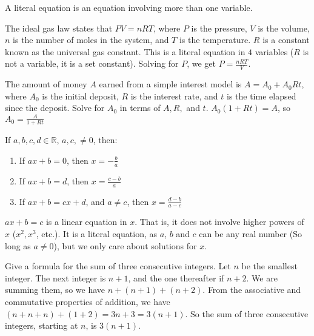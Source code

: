 \documentclass[crop=false,class=book,oneside]{standalone}                      %
\begin{document}
        \begin{definition}
        A literal equation is an equation involving more than one variable.
        \end{definition}
        \begin{example}
        The ideal gas law states that $PV=nRT$, where $P$ is the pressure, $V$ is the volume, $n$ is the number of moles in the system, and $T$ is the temperature. $R$ is a constant known as the universal gas constant. This is a literal equation in $4$ variables ($R$ is not a variable, it is a set constant). Solving for $P$, we get $P = \frac{nRT}{V}$.
        \end{example}
        \begin{example}
        The amount of money $A$ earned from a simple interest model is $A = A_0+A_0Rt$, where $A_0$ is the initial deposit, $R$ is the
        interest rate, and $t$ is the time elapsed since the deposit. Solve for $A_0$ in terms of $A,R,$ and $t$.
        $A_{0}(1+Rt)=A$, so $A_{0}=\frac{A}{1+Rt}$
        \end{example}
        \begin{theorem}
        If $a,b,c,d\in \mathbb{R}$, $a,c, \ne 0$, then:
        \begin{enumerate}
        \item If $ax+b=0$, then $x=-\frac{b}{a}$
        \item If $ax+b=d$, then $x=\frac{c-b}{a}$
        \item If $ax+b=cx+d$, and $a\ne c$, then $x =\frac{d-b}{a-c}$
        \end{enumerate}
        \end{theorem}
        \begin{remark}
        $ax+b=c$ is a linear equation in $x$. That is, it does not involve higher powers of $x$ ($x^{2},x^{3}$, etc.). It is a literal
        equation, as $a$, $b$ and $c$ can be any real number (So long as $a\ne 0$), but we only care about solutions for $x$.
        \end{remark}
        \begin{example}
            Give a formula for the sum of three consecutive integers. Let $n$ be the smallest integer. The next integer is $n+1$, and the one
            thereafter if $n+2$. We are summing them, so we have $n+(n+1)+(n+2)$. From the associative and commutative properties of addition,
            we have $(n+n+n)+(1+2)=3n+3=3(n+1)$. So the sum of three consecutive integers, starting at $n$, is $3(n+1)$.
        \end{example}
\end{document}
